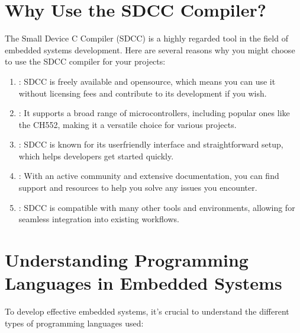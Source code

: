 \documentclass[letterpaper,10pt,english]{sphinxmanual}
\begin{document}
\section{Why Use the SDCC Compiler?}
\label{\detokenize{about:why-use-the-sdcc-compiler}}
\sphinxAtStartPar
The Small Device C Compiler (SDCC) is a highly regarded tool in the field of embedded systems development. Here are several reasons why you might choose to use the SDCC compiler for your projects:
\begin{enumerate}
%
\item {} 
\sphinxAtStartPar
{}: SDCC is freely available and open\sphinxhyphen{}source, which means you can use it without licensing fees and contribute to its development if you wish.

\item {} 
\sphinxAtStartPar
{}: It supports a broad range of microcontrollers, including popular ones like the CH552, making it a versatile choice for various projects.

\item {} 
\sphinxAtStartPar
{}: SDCC is known for its user\sphinxhyphen{}friendly interface and straightforward setup, which helps developers get started quickly.

\item {} 
\sphinxAtStartPar
{}: With an active community and extensive documentation, you can find support and resources to help you solve any issues you encounter.

\item {} 
\sphinxAtStartPar
{}: SDCC is compatible with many other tools and environments, allowing for seamless integration into existing workflows.

\end{enumerate}


\section{Understanding Programming Languages in Embedded Systems}
\label{\detokenize{about:understanding-programming-languages-in-embedded-systems}}
\sphinxAtStartPar
To develop effective embedded systems, it’s crucial to understand the different types of programming languages used:
\end{document}

